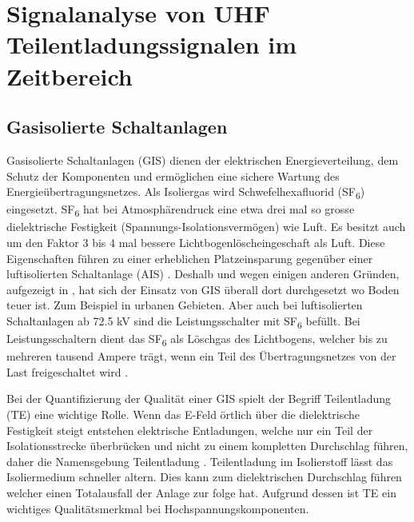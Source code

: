 %
%
%
\chapter{Signalanalyse von UHF Teilentladungssignalen im Zeitbereich \label{chapter:gis}}
\begin{refsection}

\section{Gasisolierte Schaltanlagen}

Gasisolierte Schaltanlagen (GIS) dienen der elektrischen Energieverteilung, dem Schutz der Komponenten und ermöglichen eine sichere Wartung des Energieübertragungsnetzes.
Als Isoliergas wird Schwefelhexafluorid (SF\textsubscript{6}) eingesetzt. SF\textsubscript{6} hat bei Atmosphärendruck eine etwa drei mal so grosse dielektrische Festigkeit (Spannungs-Isolationsvermögen) wie Luft. 
Es besitzt auch um den Faktor 3 bis 4 mal bessere Lichtbogenlöscheingeschaft als Luft. 
Diese Eigenschaften führen zu einer erheblichen Platzeinsparung gegenüber einer luftisolierten Schaltanlage (AIS) \cite{buch:ABB}.
Deshalb und wegen einigen anderen Gründen, aufgezeigt in \cite{buch:GIS/AIS}, hat sich der Einsatz von GIS überall dort durchgesetzt wo Boden teuer ist. Zum Beispiel in urbanen Gebieten. Aber auch bei luftisolierten Schaltanlagen ab 72.5 kV sind die Leistungsschalter mit SF\textsubscript{6} befüllt. 
Bei Leistungsschaltern dient das SF\textsubscript{6} als Löschgas des Lichtbogens, welcher bis zu mehreren tausend Ampere trägt, wenn ein Teil des Übertragungsnetzes von der Last freigeschaltet  wird \cite{buch:ABB}.

Bei der Quantifizierung der Qualität einer GIS spielt der Begriff Teilentladung (TE) eine wichtige Rolle. 
Wenn das E-Feld örtlich über die dielektrische Festigkeit steigt entstehen elektrische Entladungen, welche nur ein Teil der Isolationsstrecke überbrücken und nicht zu einem kompletten Durchschlag führen, daher die Namensgebung Teilentladung \cite{buch:Kuchler}.
Teilentladung im Isolierstoff lässt das Isoliermedium  schneller altern. Dies kann zum dielektrischen Durchschlag führen welcher einen Totalausfall der Anlage zur folge hat.
Aufgrund dessen ist TE ein wichtiges Qualitätsmerkmal bei Hochspannungskomponenten. 


\end{refsection}
